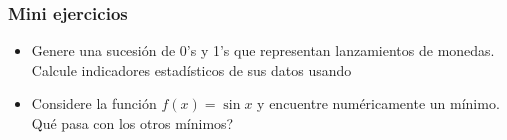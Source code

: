 \documentclass[14pt,aspectratio=169,xcolor=dvipsnames]{beamer}
\begin{document}
\begin{frame}
    \maketitle
\end{frame}
\begin{frame}\frametitle{Mini ejercicios}
    \begin{itemize}
        \item Genere una sucesión de 0's y 1's que representan lanzamientos de monedas. Calcule indicadores estadísticos de sus datos usando 
        \item Considere la función $f(x)=\sin x$ y encuentre numéricamente un mínimo. Qué pasa con los otros mínimos? 
    \end{itemize}
\end{frame}
\end{document}
